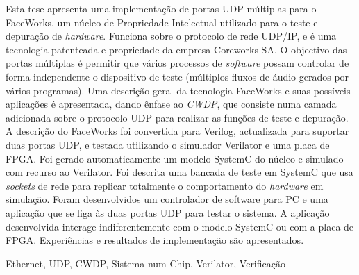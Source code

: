 \documentclass[defaultstyle,10pt,master,Helvetica]{thesis}
\begin{document}

\begin{resumo}
Esta tese apresenta uma implementação de portas \ac{UDP} múltiplas para o FaceWorks, um núcleo de Propriedade Intelectual utilizado para o teste  e depuração de \textit{hardware}. Funciona sobre o protocolo de rede \ac{UDP}/\ac{IP}, e é uma tecnologia patenteada e propriedade da empresa Coreworks SA. O objectivo das portas múltiplas é permitir que vários processos de \textit{software} possam controlar de forma independente o dispositivo de teste (múltiplos fluxos de áudio gerados por vários programas). Uma descrição geral da tecnologia FaceWorks e suas possíveis aplicações é apresentada, dando ênfase ao \textit{\acf{CWDP}}, que consiste numa camada adicionada sobre o protocolo \ac{UDP} para realizar as funções de teste e depuração. A descrição do FaceWorks foi convertida para Verilog, actualizada para suportar duas portas \ac{UDP}, e testada utilizando o simulador Verilator e uma placa de \ac{FPGA}. 
Foi gerado automaticamente um modelo SystemC do núcleo e simulado com recurso ao Verilator.
Foi descrita uma bancada de teste em SystemC que usa \textit{sockets} de rede para replicar totalmente o comportamento do \textit{hardware} em simulação. Foram desenvolvidos um controlador de software para PC e uma aplicação que se liga às duas portas \ac{UDP} para testar o sistema. A aplicação desenvolvida interage indiferentemente com o modelo SystemC ou com a placa de \ac{FPGA}. Experiências e resultados de implementação são apresentados.
\end{resumo}

\begin{palavraschave}
Ethernet, UDP, CWDP, Sistema-num-Chip, Verilator, Verificação
\end{palavraschave}

\clearpage
\thispagestyle{empty}
\cleardoublepage

\tableofcontents
\cleardoublepage

\listoffigures
\cleardoublepage
\end{document}
